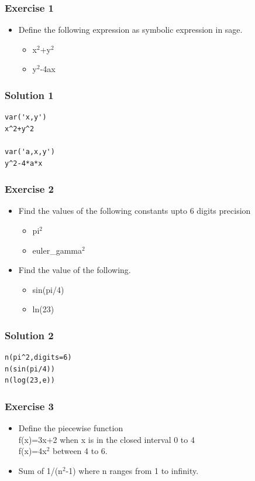 \documentclass[presentation]{beamer}
\begin{document}
\begin{frame}
\frametitle{Exercise 1}
\label{sec-4}


\begin{itemize}
\item Define the following expression as symbolic
    expression in sage.
\begin{itemize}
\item x$^2$+y$^2$
\item y$^2$-4ax
\end{itemize}
\end{itemize}
  
\end{frame}
\begin{frame}[fragile]
\frametitle{Solution 1}
\label{sec-5}

\lstset{language=Python}
\begin{lstlisting}
var('x,y')
x^2+y^2

var('a,x,y')
y^2-4*a*x
\end{lstlisting}
\end{frame}
\begin{frame}
\frametitle{Exercise 2}
\label{sec-6}


\begin{itemize}
\item Find the values of the following constants upto 6 digits  precision
\begin{itemize}
\item pi$^2$
\item euler\_gamma$^2$
\end{itemize}
\end{itemize}

\begin{itemize}
\item Find the value of the following.
\begin{itemize}
\item sin(pi/4)
\item ln(23)
\end{itemize}
\end{itemize}
\end{frame}
\begin{frame}[fragile]
\frametitle{Solution 2}
\label{sec-7}

\lstset{language=Python}
\begin{lstlisting}
n(pi^2,digits=6)
n(sin(pi/4))
n(log(23,e))
\end{lstlisting}
\end{frame}
\begin{frame}
\frametitle{Exercise 3}
\label{sec-8}


\begin{itemize}
\item Define the piecewise function\\ 
   f(x)=3x+2 
   when x is in the closed interval 0 to 4\\
   f(x)=4x$^2$
   between 4 to 6.
\vspace{4pt}
\item Sum  of 1/(n$^2$-1) where n ranges from 1 to infinity.
\end{itemize}
\end{frame}
\end{document}
